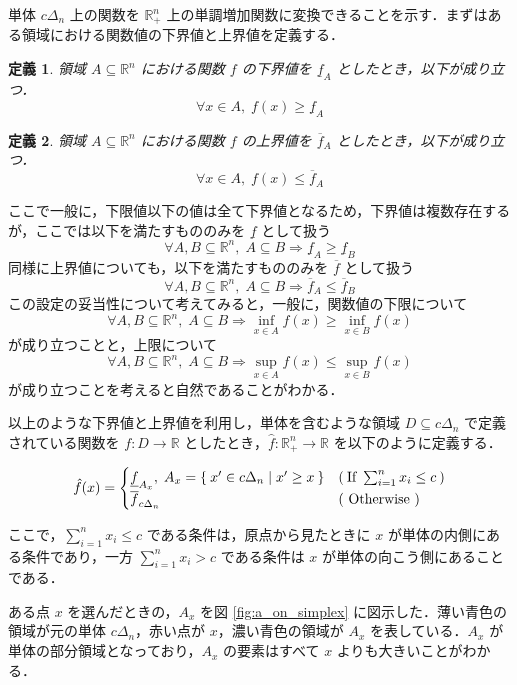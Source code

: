 \documentclass[a4paper,11pt]{jreport}
\newtheorem{definition}{定義}
\begin{document}
単体 $ c \Delta_n $ 上の関数を $ \mathbb{R}_+^n $ 上の単調増加関数に変換できることを示す．まずはある領域における関数値の下界値と上界値を定義する．

\begin{definition}
領域 $ A \subseteq \mathbb{R}^n $ における関数 $ f $ の下界値を $ \underline{f}_A $ としたとき，以下が成り立つ．
$$ \forall x \in A, \; f(x) \geq \underline{f}_A $$
\end{definition}

\begin{definition}
領域 $ A \subseteq \mathbb{R}^n $ における関数 $ f $ の上界値を $ \overline{f}_A $ としたとき，以下が成り立つ．
$$ \forall x \in A, \; f(x) \leq \overline{f}_A $$
\end{definition}

ここで一般に，下限値以下の値は全て下界値となるため，下界値は複数存在するが，ここでは以下を満たすもののみを $ \underline{f} $ として扱う
$$ \forall A, B \subseteq \mathbb{R}^n, \; A \subseteq B \Rightarrow \underline{f}_A \geq \underline{f}_B $$
同様に上界値についても，以下を満たすもののみを $ \overline{f} $ として扱う
$$ \forall A, B \subseteq \mathbb{R}^n, \; A \subseteq B \Rightarrow \overline{f}_A \leq \overline{f}_B $$
この設定の妥当性について考えてみると，一般に，関数値の下限について
$$ \forall A, B \subseteq \mathbb{R}^n, \; A \subseteq B \Rightarrow \inf_{x \in A}f(x) \geq \inf_{x \in B}f(x) $$
が成り立つことと，上限について
$$ \forall A, B \subseteq \mathbb{R}^n, \; A \subseteq B \Rightarrow \sup_{x \in A}f(x) \leq \sup_{x \in B}f(x) $$
が成り立つことを考えると自然であることがわかる．\par
以上のような下界値と上界値を利用し，単体を含むような領域 $ D \subseteq c \Delta_n $ で定義されている関数を $ f : D \to \mathbb{R} $ としたとき，$ \hat{f} : \mathbb{R}_+^n \to \mathbb{R} $ を以下のように定義する．

\begin{align*}
\hat{f}(x) =
\begin{cases}
\underline{f}_{A_x}, \; A_x = \Set{x' \in c \Delta_n | x' \geq x } & ( \: \mbox{If } \sum_{i=1}^{n}x_i \leq c \: ) \\
\overline{f}_{c \Delta_n} & (\mbox{ Otherwise })
\end{cases}
\end{align*}

ここで，$ \sum_{i=1}^{n}x_i \leq c $ である条件は，原点から見たときに $ x $ が単体の内側にある条件であり，一方 $ \sum_{i=1}^{n}x_i > c $ である条件は $ x $ が単体の向こう側にあることである．\par
ある点 $ x $ を選んだときの，$ A_x $ を図 \ref{fig:a_on_simplex} に図示した．薄い青色の領域が元の単体 $ c \Delta_n $，赤い点が $ x $，濃い青色の領域が $ A_x $ を表している．$ A_x $ が単体の部分領域となっており，$ A_x $ の要素はすべて $ x $ よりも大きいことがわかる．\par
\end{document}
